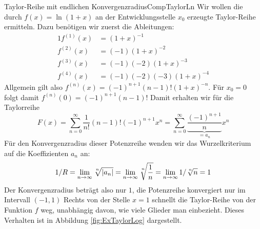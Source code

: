 \begin{example}{Taylor-Reihe mit endlichen Konvergenzradius}{CompTaylorLn}
    Wir wollen die durch $f(x) = \ln(1+x)$ an der Entwicklungsstelle $x_0$ erzeugte Taylor-Reihe ermitteln. Dazu benötigen wir zuerst die Ableitungen:
    \begin{alignat*}{1}
    f^{(1)}(x) &= (1+x)^{-1} \\
    f^{(2)}(x) &= (-1) (1+x)^{-2} \\
    f^{(3)}(x) &= (-1)(-2) (1+x)^{-3} \\
    f^{(4)}(x) &= (-1)(-2)(-3) (1+x)^{-4}
    \end{alignat*}
    Allgemein gilt also $f^{(n)}(x) = (-1)^{n+1} (n-1)! (1+x)^{-n}$. Für $x_0=0$ folgt damit $f^{(n)}(0) = (-1)^{n+1} (n-1)!$ Damit erhalten wir für die Taylorreihe
    $$
        F(x) = \sum\limits_{n=0}^\infty \frac{1}{n!} (n-1)! (-1)^{n+1} x^n = \sum\limits_{n=0}^\infty \underbrace{\frac{(-1)^{n+1}}{n}}_{=a_n} x^n
    $$
    Für den Konvergenzradius dieser Potenzreihe wenden wir das Wurzelkriterium auf die Koeffizienten $a_n$ an:
    $$
        1/R = \lim\limits_{n\to\infty} \nroot{n}{|a_n|} = \lim\limits_{n\to\infty} \nroot{n}{\frac{1}{n}} = \lim\limits_{n\to\infty} 1 / \nroot{n}{n} = 1
    $$
    Der Konvergenzradius beträgt also nur $1$, die Potenzreihe konvergiert nur im Intervall $(-1,1)$ Rechts von der Stelle $x=1$ schnellt die Taylor-Reihe von der Funktion $f$ weg, unabhängig davon, wie viele Glieder man einbezieht. Dieses Verhalten ist in Abbildung \ref{fig:ExTaylorLog} dargestellt.
\end{example}

